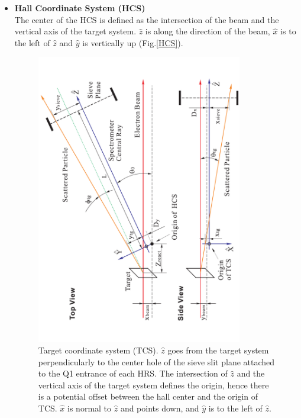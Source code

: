 \begin{itemize}
\item \textbf{Hall Coordinate System (HCS)} \\
  The center of the HCS is defined as the intersection of the beam and the vertical axis of the target system. $\hat{z}$ is along the direction of the beam, $\hat{x}$ is to the left of $\hat{z}$ and $\hat{y}$ is vertically up (Fig.\ref{HCS}).
  \begin{figure}[!ht]
    \begin{center}
      \includegraphics[type=pdf,ext=.pdf,read=.pdf,angle=270,width=0.85\textwidth]{./figures/optics/TCS}
      \caption[Target coordinate system (TCS)]{\footnotesize{Target coordinate system (TCS). $\hat{z}$ goes from the target system perpendicularly to the center hole of the sieve slit plane attached to the Q1 entrance of each HRS. The intersection of $\hat{z}$ and the vertical axis of the target system defines the origin, hence there is a potential offset between the hall center and the origin of TCS. $\hat{x}$ is normal to $\hat{z}$ and points down, and $\hat{y}$ is to the left of $\hat{z}$.}}
      \label{TCS}

\end{center}
\end{figure}
\end{itemize}
